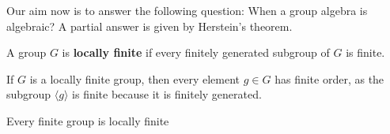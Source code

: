 %
%
%



Our aim now is to answer the following question: When
a group algebra is algebraic? 
A partial answer is given by Herstein's theorem. 

\begin{definition}
	A group $G$ is \textbf{locally finite} if every finitely generated 
	subgroup of $G$ is finite. 
\end{definition}

If $G$ is a locally finite group, then every element $g\in G$ has finite order, as
the subgroup $\langle g\rangle$ is finite because it is finitely generated.

\begin{example}
    Every finite group is locally finite
\end{example}

